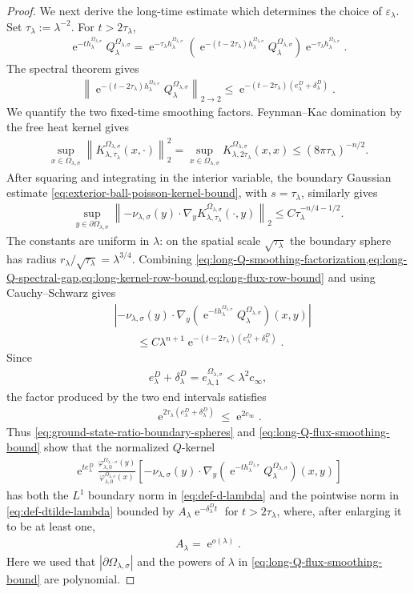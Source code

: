 \documentclass[a4paper,10pt]{article}
\numberwithin{equation}{section}
\theoremstyle{plain}
\theoremstyle{plain}
\theoremstyle{plain}
\theoremstyle{plain}
\theoremstyle{plain}
\theoremstyle{remark}
\theoremstyle{definition}
\newcommand{\ee}{\operatorname{e}}
\newcommand\norm[1]{\left\lVert#1\right\rVert}
\newcommand{\vf}{\varphi}
\newcommand{\abs}[1]{\left\lvert#1\right\rvert}
\newcommand{\eq}[1]{\begin{align*}#1\end{align*}}
\newcommand{\eql}[1]{\begin{align}#1\end{align}}
\newcommand{\br}[1]{\left(#1\right)}
\begin{document}
\begin{proof}
We next derive the long-time estimate which determines the choice of
$\varepsilon_\lambda$. Set $\tau_\lambda:=\lambda^{-2}$. For
$t>2\tau_\lambda$,
\eql{
\ee^{-t h_\lambda^{\Omega_{\lambda,\sigma}}}
Q_\lambda^{\Omega_{\lambda,\sigma}}
=
\ee^{-\tau_\lambda h_\lambda^{\Omega_{\lambda,\sigma}}}
\left(
\ee^{-(t-2\tau_\lambda)h_\lambda^{\Omega_{\lambda,\sigma}}}
Q_\lambda^{\Omega_{\lambda,\sigma}}
\right)
\ee^{-\tau_\lambda h_\lambda^{\Omega_{\lambda,\sigma}}}.
\label{eq:long-Q-smoothing-factorization}
}
The spectral theorem gives
\eql{
\norm{
\ee^{-(t-2\tau_\lambda)h_\lambda^{\Omega_{\lambda,\sigma}}}
Q_\lambda^{\Omega_{\lambda,\sigma}}
}_{2\to2}
\leq
\ee^{-(t-2\tau_\lambda)\br{e_\lambda^D+\delta_\lambda^D}}.
\label{eq:long-Q-spectral-gap}
}
We quantify the two fixed-time smoothing factors. Feynman--Kac
domination by the free heat kernel gives
\eql{
\sup_{x\in\Omega_{\lambda,\sigma}}
\norm{
K_{\lambda,\tau_\lambda}^{\Omega_{\lambda,\sigma}}(x,\cdot)
}_2^2
=
\sup_{x\in\Omega_{\lambda,\sigma}}
K_{\lambda,2\tau_\lambda}^{\Omega_{\lambda,\sigma}}(x,x)
\leq
(8\pi\tau_\lambda)^{-n/2}.
\label{eq:long-kernel-row-bound}
}
After squaring and integrating in the interior variable, the boundary
Gaussian estimate
\cref{eq:exterior-ball-poisson-kernel-bound}, with
$s=\tau_\lambda$, similarly gives
\eql{
\sup_{y\in\partial\Omega_{\lambda,\sigma}}
\norm{
-\nu_{\lambda,\sigma}(y)\cdot
\nabla_y
K_{\lambda,\tau_\lambda}^{\Omega_{\lambda,\sigma}}
(\cdot,y)
}_2
\leq
C\tau_\lambda^{-n/4-1/2}.
\label{eq:long-flux-row-bound}
}
The constants are uniform in $\lambda$: on the spatial scale
$\sqrt{\tau_\lambda}$ the boundary sphere has radius
$r_\lambda/\sqrt{\tau_\lambda}=\lambda^{3/4}$.
Combining
\cref{eq:long-Q-smoothing-factorization,eq:long-Q-spectral-gap,eq:long-kernel-row-bound,eq:long-flux-row-bound}
and using Cauchy--Schwarz gives
\eql{
&\abs{
-\nu_{\lambda,\sigma}(y)\cdot
\nabla_y
\left(
\ee^{-t h_\lambda^{\Omega_{\lambda,\sigma}}}
Q_\lambda^{\Omega_{\lambda,\sigma}}
\right)(x,y)
}
\nonumber\\
&\qquad\leq
C\lambda^{n+1}
\ee^{-(t-2\tau_\lambda)
\br{e_\lambda^D+\delta_\lambda^D}}.
\label{eq:long-Q-flux-smoothing-bound}
}
Since
\eq{
e_\lambda^D+\delta_\lambda^D
=
e_{\lambda,1}^{\Omega_{\lambda,\sigma}}
<
\lambda^2c_\infty,
}
the factor produced by the two end intervals satisfies
\eq{
\ee^{2\tau_\lambda
\br{e_\lambda^D+\delta_\lambda^D}}
\leq
\ee^{2c_\infty}.
}
Thus \cref{eq:ground-state-ratio-boundary-spheres} and
\cref{eq:long-Q-flux-smoothing-bound} show that the normalized
$Q$-kernel
\eq{
\ee^{t e_\lambda^D}
\frac{
\vf_{\lambda,0}^{\Omega_{\lambda,-\sigma}}(y)
}{
\vf_{\lambda,0}^{\Omega_{\lambda,\sigma}}(x)
}
\left[
-\nu_{\lambda,\sigma}(y)\cdot
\nabla_y
\left(
\ee^{-t h_\lambda^{\Omega_{\lambda,\sigma}}}
Q_\lambda^{\Omega_{\lambda,\sigma}}
\right)(x,y)
\right]
}
has both the $L^1$ boundary norm in \cref{eq:def-d-lambda} and the
pointwise norm in \cref{eq:def-dtilde-lambda} bounded by
$A_\lambda\ee^{-\delta_\lambda^Dt}$ for $t>2\tau_\lambda$, where,
after enlarging it to be at least one,
\eq{
A_\lambda=\ee^{o(\lambda)}.
}
Here we used that $\abs{\partial\Omega_{\lambda,\sigma}}$ and the
powers of $\lambda$ in
\cref{eq:long-Q-flux-smoothing-bound} are polynomial.


\end{proof}
\end{document}
